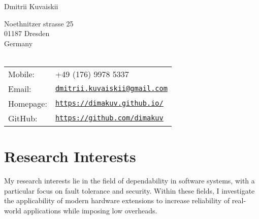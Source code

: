 \documentclass[letterpaper]{article}
\def\name{Dmitrii Kuvaiskii}
\begin{document}
{\huge \name}



\begin{minipage}{0.45\linewidth}
Noethnitzer strasse 25\\
01187 Dresden\\
Germany\\
\\

 
\end{minipage}
\begin{minipage}{0.45\linewidth}
  \begin{tabular}{ll}
      Mobile: & +49 (176) 9978 5337\\
      Email: & \href{mailto:dmitrii.kuvaiskii@gmail.com}{\tt dmitrii.kuvaiskii@gmail.com} \\
    Homepage: & \href{https://dimakuv.github.io/}{\tt https://dimakuv.github.io/} \\
    GitHub: & \href{https://github.com/dimakuv}{\tt https://github.com/dimakuv} \\
  \end{tabular}
\end{minipage}


\section*{Research Interests}

My research interests lie in the field of dependability in software systems, with a particular focus on fault tolerance and security. Within these fields, I investigate the applicability of modern hardware extensions to increase reliability of real-world applications while imposing low overheads.

\end{document}
